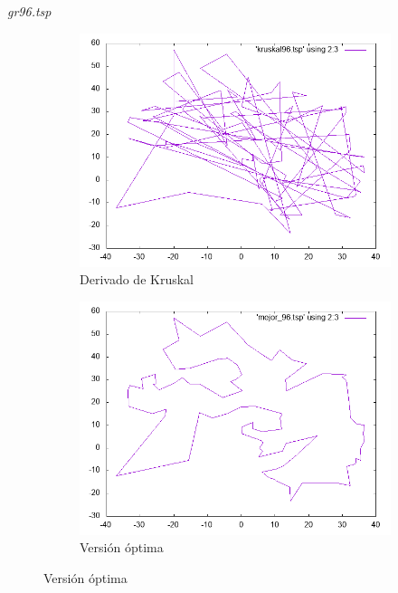 \documentclass{beamer}
\begin{document}
\begin{frame}[fragile]{\textit{gr96.tsp}}
\begin{figure}[H]
\begin{subfigure}[b]{0.36\textwidth}
\includegraphics[width=\textwidth]{gr96_kruskal.png}
\caption*{\small{Derivado de Kruskal}}
\end{subfigure}
\quad
\begin{subfigure}[b]{0.36\textwidth}
\includegraphics[width=\textwidth]{gr96_mejor.png}
\caption*{\small{Versión óptima}}
\end{subfigure}
\end{figure}

\end{frame}
\end{document}
